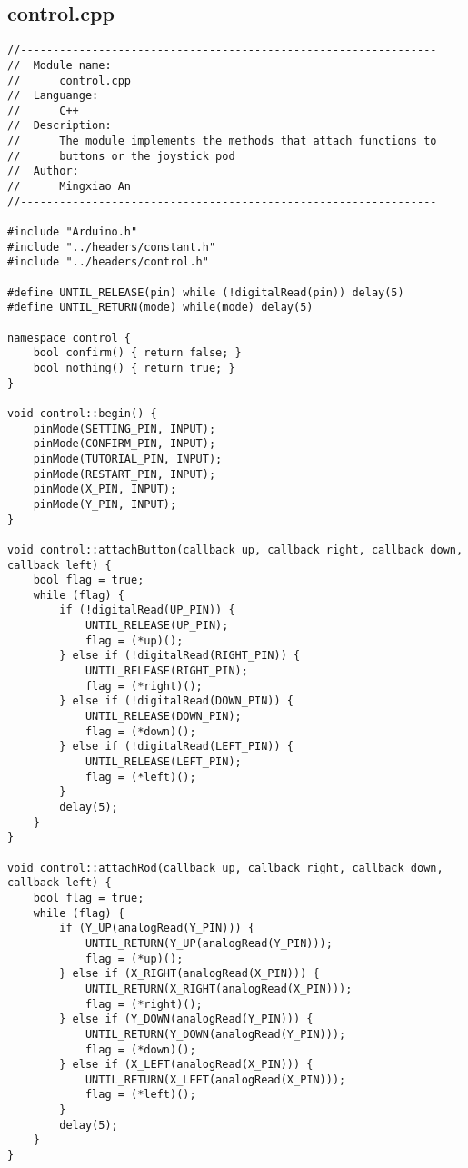 \subsection{control.cpp}
\begin{verbatim}
//----------------------------------------------------------------
//  Module name:
//      control.cpp
//  Languange:
//      C++
//  Description:
//      The module implements the methods that attach functions to
//      buttons or the joystick pod
//  Author:
//      Mingxiao An
//----------------------------------------------------------------

#include "Arduino.h"
#include "../headers/constant.h"
#include "../headers/control.h"

#define UNTIL_RELEASE(pin) while (!digitalRead(pin)) delay(5)
#define UNTIL_RETURN(mode) while(mode) delay(5)

namespace control {
    bool confirm() { return false; }
    bool nothing() { return true; }
}

void control::begin() {
    pinMode(SETTING_PIN, INPUT);
    pinMode(CONFIRM_PIN, INPUT);
    pinMode(TUTORIAL_PIN, INPUT);
    pinMode(RESTART_PIN, INPUT);
    pinMode(X_PIN, INPUT);
    pinMode(Y_PIN, INPUT);
}

void control::attachButton(callback up, callback right, callback down, callback left) {
    bool flag = true;
    while (flag) {
        if (!digitalRead(UP_PIN)) {
            UNTIL_RELEASE(UP_PIN);
            flag = (*up)();
        } else if (!digitalRead(RIGHT_PIN)) {
            UNTIL_RELEASE(RIGHT_PIN);
            flag = (*right)();
        } else if (!digitalRead(DOWN_PIN)) {
            UNTIL_RELEASE(DOWN_PIN);
            flag = (*down)();
        } else if (!digitalRead(LEFT_PIN)) {
            UNTIL_RELEASE(LEFT_PIN);
            flag = (*left)();
        }
        delay(5);
    }
}

void control::attachRod(callback up, callback right, callback down, callback left) {
    bool flag = true;
    while (flag) {
        if (Y_UP(analogRead(Y_PIN))) {
            UNTIL_RETURN(Y_UP(analogRead(Y_PIN)));
            flag = (*up)();
        } else if (X_RIGHT(analogRead(X_PIN))) {
            UNTIL_RETURN(X_RIGHT(analogRead(X_PIN)));
            flag = (*right)();
        } else if (Y_DOWN(analogRead(Y_PIN))) {
            UNTIL_RETURN(Y_DOWN(analogRead(Y_PIN)));
            flag = (*down)();
        } else if (X_LEFT(analogRead(X_PIN))) {
            UNTIL_RETURN(X_LEFT(analogRead(X_PIN)));
            flag = (*left)();
        }
        delay(5);
    }
}


\end{verbatim}
